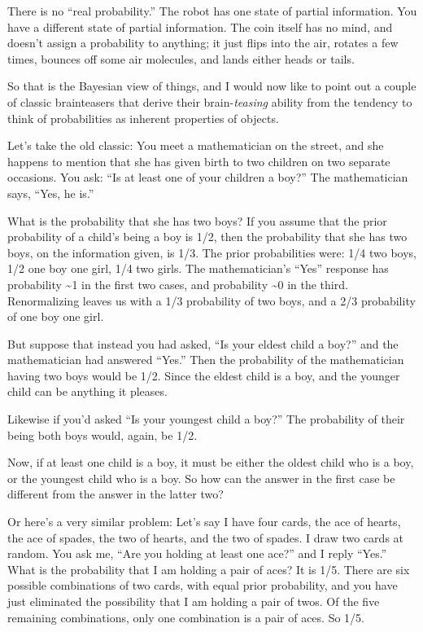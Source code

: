 {
 There is no ``real
probability.'' The robot has one state of partial
information. You have a different state of partial information. The
coin itself has no mind, and doesn't assign a
probability to anything; it just flips into the air, rotates a few
times, bounces off some air molecules, and lands either heads or
tails.}

{
 So that is the Bayesian view of things, and I would now like to
point out a couple of classic brainteasers that derive their
brain-\textit{teasing} ability from the tendency to think of
probabilities as inherent properties of objects.}

{
 Let's take the old classic: You meet a
mathematician on the street, and she happens to mention that she has
given birth to two children on two separate occasions. You ask:
``Is at least one of your children a
boy?'' The mathematician says,
``Yes, he is.''}

{
 What is the probability that she has two boys? If you assume that
the prior probability of a child's being a boy is 1/2,
then the probability that she has two boys, on the information given,
is 1/3. The prior probabilities were: 1/4 two boys, 1/2 one boy one
girl, 1/4 two girls. The mathematician's
``Yes'' response has probability
\~{}1 in the first two cases, and probability \~{}0 in the third.
Renormalizing leaves us with a 1/3 probability of two boys, and a 2/3
probability of one boy one girl.}

{
 But suppose that instead you had asked, ``Is your
eldest child a boy?'' and the mathematician had
answered ``Yes.'' Then the
probability of the mathematician having two boys would be 1/2. Since
the eldest child is a boy, and the younger child can be anything it
pleases.}

{
 Likewise if you'd asked ``Is your
youngest child a boy?'' The probability of their
being both boys would, again, be 1/2.}

{
 Now, if at least one child is a boy, it must be either the oldest
child who is a boy, or the youngest child who is a boy. So how can the
answer in the first case be different from the answer in the latter
two?}

{
 Or here's a very similar problem:
Let's say I have four cards, the ace of hearts, the ace
of spades, the two of hearts, and the two of spades. I draw two cards
at random. You ask me, ``Are you holding at least one
ace?'' and I reply
``Yes.'' What is the probability
that I am holding a pair of aces? It is 1/5. There are six possible
combinations of two cards, with equal prior probability, and you have
just eliminated the possibility that I am holding a pair of twos. Of
the five remaining combinations, only one combination is a pair of
aces. So 1/5.}


